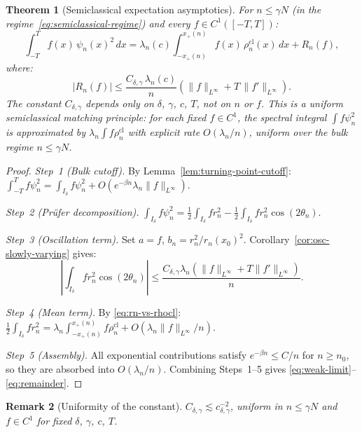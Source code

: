 \documentclass[12pt,a4paper]{amsart}
\newtheorem{theorem}{Theorem}[section]
\newtheorem{remark}[theorem]{Remark}
\newcommand{\psin}{\psi_n}
\newcommand{\rhocl}{\rho^{\mathrm{cl}}}
\begin{document}
\begin{theorem}[Semiclassical expectation asymptotics]%
\label{thm:weak-limit}
For $n \le \gamma N$ (in the regime~\eqref{eq:semiclassical-regime})
and every $f \in C^1([-T,T])$:
\begin{equation}\label{eq:weak-limit}
  \int_{-T}^T f(x)\,\psin(x)^2\,dx
  = \lambda_n(c)
    \int_{-x_+(n)}^{x_+(n)} f(x)\,\rhocl_n(x)\,dx
    + R_n(f),
\end{equation}
where:
\begin{equation}\label{eq:remainder}
  |R_n(f)|
  \le \frac{C_{\delta,\gamma}\,\lambda_n(c)}{n}
      \left(\|f\|_{L^\infty} + T\,\|f'\|_{L^\infty}\right).
\end{equation}
The constant $C_{\delta,\gamma}$ depends only on
$\delta$, $\gamma$, $c$, $T$, not on $n$ or $f$.
This is a \emph{uniform semiclassical matching principle}:
for each fixed $f \in C^1$, the spectral integral
$\int f \psin^2$ is approximated by
$\lambda_n \int f \rhocl_n$ with explicit rate $O(\lambda_n/n)$,
uniform over the bulk regime $n \le \gamma N$.
\end{theorem}

\begin{proof}
\textit{Step~1 (Bulk cutoff).}
By Lemma~\ref{lem:turning-point-cutoff}:
$\int_{-T}^T f\psin^2
= \int_{I_\delta} f\psin^2
+ O(e^{-\beta n}\lambda_n\|f\|_{L^\infty})$.

\textit{Step~2 (Pr\"ufer decomposition).}
$\int_{I_\delta}f\psin^2
= \tfrac{1}{2}\int_{I_\delta}fr_n^2
- \tfrac{1}{2}\int_{I_\delta}fr_n^2\cos(2\theta_n)$.

\textit{Step~3 (Oscillation term).}
Set $a = f$, $b_n = r_n^2/r_n(x_0)^2$.
Corollary~\ref{cor:osc-slowly-varying} gives:
\[
  \left|\int_{I_\delta}fr_n^2\cos(2\theta_n)\right|
  \le \frac{C_{\delta,\gamma}\lambda_n
            (\|f\|_{L^\infty} + T\|f'\|_{L^\infty})}{n}.
\]

\textit{Step~4 (Mean term).}
By \eqref{eq:rn-vs-rhocl}:
$\tfrac{1}{2}\int_{I_\delta}fr_n^2
= \lambda_n\int_{-x_+(n)}^{x_+(n)}f\rhocl_n
+ O(\lambda_n\|f\|_{L^\infty}/n)$.

\textit{Step~5 (Assembly).}
All exponential contributions satisfy $e^{-\beta n} \le C/n$
for $n \ge n_0$, so they are absorbed into $O(\lambda_n/n)$.
Combining Steps~1--5 gives
\eqref{eq:weak-limit}--\eqref{eq:remainder}.
\end{proof}

\begin{remark}[Uniformity of the constant]
$C_{\delta,\gamma} \lesssim c_{\delta,\gamma}^{-2}$,
uniform in $n \le \gamma N$ and $f \in C^1$
for fixed $\delta$, $\gamma$, $c$, $T$.
\end{remark}
\end{document}
